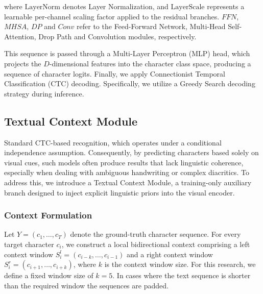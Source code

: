 \documentclass[final,5p,times]{elsarticle}
\begin{document}
where $\text{LayerNorm}$ denotes Layer Normalization, and $\text{LayerScale}$ represents a learnable per-channel scaling factor applied to the residual branches. $FFN$, $MHSA$, $DP$ and $Conv$ refer to the Feed-Forward Network, Multi-Head Self-Attention, Drop Path and Convolution modules, respectively.

This sequence is passed through a Multi-Layer Perceptron (MLP) head, which projects the $D$-dimensional features into the character class space, producing a sequence of character logits. Finally, we apply Connectionist Temporal Classification (CTC) decoding. Specifically, we utilize a Greedy Search decoding strategy during inference.

\subsection{Textual Context Module}

Standard CTC-based recognition, which operates under a conditional independence assumption. Consequently, by predicting characters based solely on visual cues, such models often produce results that lack linguistic coherence, especially when dealing with ambiguous handwriting or complex diacritics. To address this, we introduce a Textual Context Module, a training-only auxiliary branch designed to inject explicit linguistic priors into the visual encoder.



\subsubsection{Context Formulation}
Let $Y=(c_1, \dots, c_T)$ denote the ground-truth character sequence. For every target character $c_i$, we construct a local bidirectional context comprising a left context window $S_i^l=(c_{i-k}, \dots, c_{i-1})$ and a right context window $S_i^r=(c_{i+1}, \dots, c_{i+k})$, where $k$ is the context window size. For this research, we define a fixed window size of $k=5$. In cases where the text sequence is shorter than the required window the sequences are padded.
\end{document}
